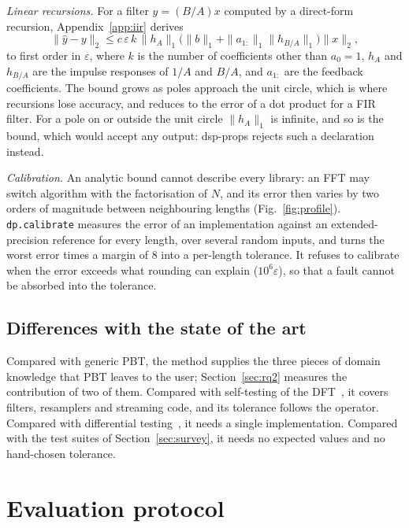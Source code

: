 \documentclass[10pt,conference]{IEEEtran}
\newcommand{\eps}{\varepsilon}
\newcommand{\code}[1]{\texttt{#1}}
\begin{document}
\emph{Linear recursions.} For a filter $y=(B/A)x$ computed by a direct-form
recursion, Appendix~\ref{app:iir} derives
\begin{equation}
\|\hat y-y\|_2 \le c\,\eps\,k\,\|h_A\|_1\bigl(\|b\|_1+\|a_{1:}\|_1\|h_{B/A}\|_1\bigr)\|x\|_2,
\label{eq:iir}
\end{equation}
to first order in $\eps$, where $k$ is the number of coefficients other than $a_0=1$, $h_A$ and
$h_{B/A}$ are the impulse responses of $1/A$ and $B/A$, and $a_{1:}$ are the
feedback coefficients. The bound grows as poles approach the unit circle, which
is where recursions lose accuracy, and reduces to the error of a dot product for
a FIR filter. For a pole on or outside the unit circle $\|h_A\|_1$ is infinite,
and so is the bound, which would accept any output: dsp-props rejects such a
declaration instead.

\emph{Calibration.} An analytic bound cannot describe every library: an FFT
may switch algorithm with the factorisation of $N$, and its error then varies by
two orders of magnitude between neighbouring lengths (Fig.~\ref{fig:profile}).
\code{dp.calibrate} measures the error of an implementation against an
extended-precision reference for every length, over several random inputs, and
turns the worst error times a margin of 8 into a per-length tolerance. It
refuses to calibrate when the error exceeds what rounding can explain
($10^6\eps$), so that a fault cannot be absorbed into the tolerance.

\subsection{Differences with the state of the art}
Compared with generic PBT, the method supplies the three pieces of domain
knowledge that PBT leaves to the user; Section~\ref{sec:rq2} measures the
contribution of two of them. Compared with self-testing of the
DFT~\cite{ergun1995testing,fftwverify}, it covers filters, resamplers and
streaming code, and its tolerance follows the operator. Compared with
differential testing~\cite{vanover2020fpdiff}, it needs a single implementation.
Compared with the test suites of Section~\ref{sec:survey}, it needs no expected
values and no hand-chosen tolerance.

\section{Evaluation protocol}
\label{sec:protocol}
\end{document}
